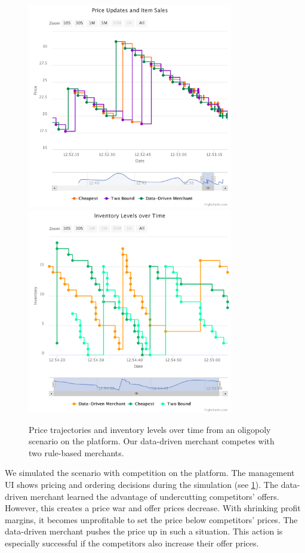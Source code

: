 \begin{figure}[p]
	\centering
	\includegraphics[width=0.8\textwidth]{figures/competition_prices.pdf}
	\includegraphics[width=0.8\textwidth]{figures/competition_inventory.pdf}
	\caption{Price trajectories and inventory levels over time from an oligopoly scenario on the \pricewars platform. Our data-driven merchant competes with two rule-based merchants.}
	\label{fig:competition}
\end{figure}

We simulated the scenario with competition on the \pricewars platform.
The management UI shows pricing and ordering decisions during the simulation (see \cref{fig:competition}).
The data-driven merchant learned the advantage of undercutting competitors' offers.
However, this creates a price war and offer prices decrease.
With shrinking profit margins, it becomes unprofitable to set the price below competitors' prices.
The data-driven merchant pushes the price up in such a situation.
This action is especially successful if the competitors also increase their offer prices.

